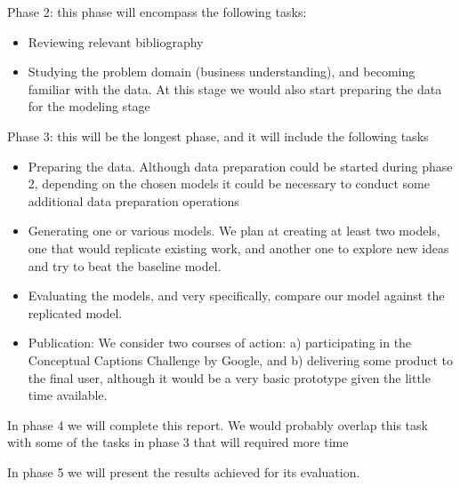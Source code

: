 Phase 2: this phase will encompass the following tasks:
\begin{itemize}
\item Reviewing relevant bibliography
\item Studying the problem domain (business understanding), and becoming familiar with the data. At this stage we would also start preparing the data for the modeling stage
\end{itemize}

Phase 3: this will be the longest phase, and it will include the following tasks  
\begin{itemize}
\item Preparing the data. Although data preparation could be started during phase 2, depending on the chosen models it could be necessary to conduct some additional data preparation operations
\item Generating one or various models. We plan at creating at least two models, one that would replicate existing work, and another one to explore new ideas and try to beat the baseline model.
\item Evaluating the models, and very specifically, compare our model against the replicated model.
\item Publication: We consider two courses of action: a) participating in the Conceptual Captions Challenge by Google, and b) delivering some product to the final user, although it would be a very basic prototype given the little time available.
\end{itemize}

In phase 4 we will complete this report. We would probably overlap this task with some of the tasks in phase 3 that will required more time

In phase 5 we will present the results achieved for its evaluation.

